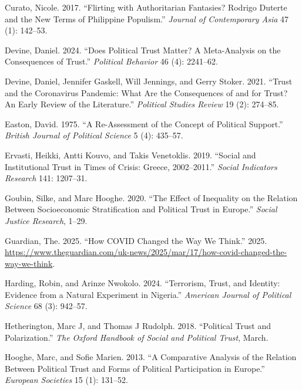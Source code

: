 \documentclass[
  12pt,
]{article}
\newlength{\cslhangindent}
\newenvironment{CSLReferences}[2] %
 {\begin{list}{}{%
  \setlength{\itemindent}{0pt}
  \setlength{\leftmargin}{0pt}
  \setlength{\parsep}{0pt}
  \ifodd #1
   \setlength{\leftmargin}{\cslhangindent}
   \setlength{\itemindent}{-1\cslhangindent}
  \fi
  \setlength{\itemsep}{#2\baselineskip}}}
 {\end{list}}
\begin{document}
\begin{CSLReferences}{1}{0}
Curato, Nicole. 2017. {``Flirting with Authoritarian Fantasies? Rodrigo Duterte and the New Terms of Philippine Populism.''} \emph{Journal of Contemporary Asia} 47 (1): 142--53.

Devine, Daniel. 2024. {``Does Political Trust Matter? A Meta-Analysis on the Consequences of Trust.''} \emph{Political Behavior} 46 (4): 2241--62.

Devine, Daniel, Jennifer Gaskell, Will Jennings, and Gerry Stoker. 2021. {``Trust and the Coronavirus Pandemic: What Are the Consequences of and for Trust? An Early Review of the Literature.''} \emph{Political Studies Review} 19 (2): 274--85.

Easton, David. 1975. {``A Re-Assessment of the Concept of Political Support.''} \emph{British Journal of Political Science} 5 (4): 435--57.

Ervasti, Heikki, Antti Kouvo, and Takis Venetoklis. 2019. {``Social and Institutional Trust in Times of Crisis: Greece, 2002--2011.''} \emph{Social Indicators Research} 141: 1207--31.

Goubin, Silke, and Marc Hooghe. 2020. {``The Effect of Inequality on the Relation Between Socioeconomic Stratification and Political Trust in Europe.''} \emph{Social Justice Research}, 1--29.

Guardian, The. 2025. {``How COVID Changed the Way We Think.''} 2025. \url{https://www.theguardian.com/uk-news/2025/mar/17/how-covid-changed-the-way-we-think}.

Harding, Robin, and Arinze Nwokolo. 2024. {``Terrorism, Trust, and Identity: Evidence from a Natural Experiment in Nigeria.''} \emph{American Journal of Political Science} 68 (3): 942--57.

Hetherington, Marc J, and Thomas J Rudolph. 2018. {``Political Trust and Polarization.''} \emph{The Oxford Handbook of Social and Political Trust}, March.

Hooghe, Marc, and Sofie Marien. 2013. {``A Comparative Analysis of the Relation Between Political Trust and Forms of Political Participation in Europe.''} \emph{European Societies} 15 (1): 131--52.


\end{CSLReferences}
\end{document}
